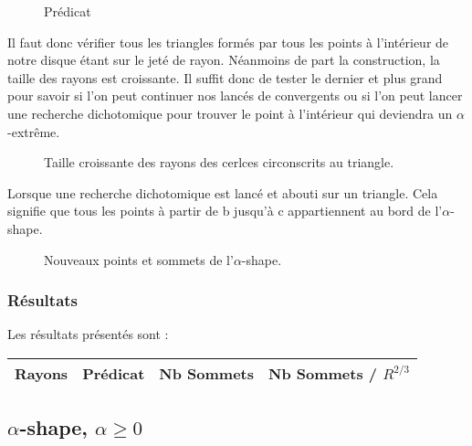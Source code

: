 \begin{figure}[h!]
  \centering
  \caption{Prédicat}
\end{figure}

Il faut donc vérifier tous les triangles formés par tous les points à l'intérieur de notre disque étant sur le jeté de rayon. Néanmoins de part la construction, la taille des rayons est croissante. Il suffit donc de tester le dernier et plus grand pour savoir si l'on peut continuer nos lancés de convergents ou si l'on peut lancer une recherche dichotomique pour trouver le point à l'intérieur qui deviendra un $\alpha$-extrême.

\begin{figure}[h!]
  \centering
  \caption{Taille croissante des rayons des cerlces circonscrits au triangle.}
\end{figure}

Lorsque une recherche dichotomique est lancé et abouti sur un triangle. Cela signifie que tous les points à partir de b jusqu'à c appartiennent au bord de l'$\alpha$-shape.

\begin{figure}[h!]
  \centering
  \caption{Nouveaux points et sommets de l'$\alpha$-shape.}
\end{figure}

\subsubsection{Résultats}

Les résultats présentés sont : 

\begin{tabular}{|l|c||c|c|}
\hline
Rayons & Prédicat & Nb Sommets & Nb Sommets / $R^{2/3}$\\
\hline

\hline
\end{tabular} 



\subsection{$\alpha$-shape, $\alpha \geq 0$}

